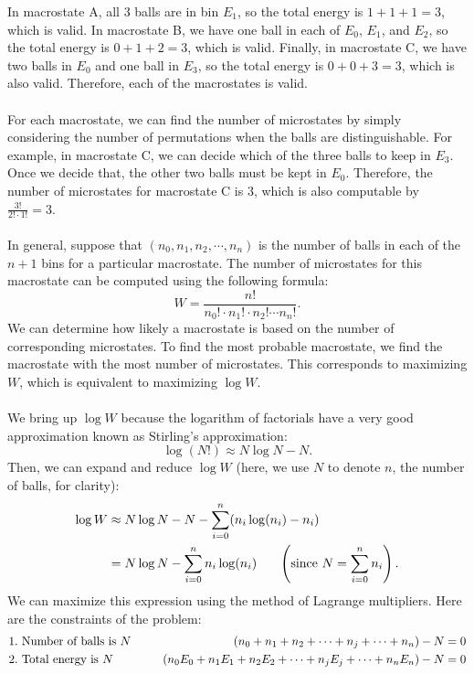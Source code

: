 \documentclass{article}
\begin{document}
\noindent 
In macrostate A, all 3 balls are in bin $E_1$, so the total energy is $1+1+1=3$, which is valid. In macrostate B, we have one ball in each of $E_0$, $E_1$, and $E_2$, so the total energy is $0+1+2=3$, which is valid. Finally, in macrostate C, we have two balls in $E_0$ and one ball in $E_3$, so the total energy is $0+0+3=3$, which is also valid. Therefore, each of the macrostates is valid. 
\\
\\
For each macrostate, we can find the number of microstates by simply considering the number of permutations when the balls are distinguishable. For example, in macrostate C, we can decide which of the three balls to keep in $E_3$. Once we decide that, the other two balls must be kept in $E_0$. Therefore, the number of microstates for macrostate C is 3, which is also computable by $\frac{3!}{2!\cdot 1!}=3$. 
\\
\\
In general, suppose that $(n_0, n_1, n_2, \cdots , n_n)$ is the number of balls in each of the $n+1$ bins for a particular macrostate. The number of microstates for this macrostate can be computed using the following formula:
\[W=\frac{n!}{n_0!\cdot n_1!\cdot n_2!\cdots n_n!}.\]
We can determine how likely a macrostate is based on the number of corresponding microstates. To find the most probable macrostate, we find the macrostate with the most number of microstates. This corresponds to maximizing $W$, which is equivalent to maximizing $\log W$.
\\
\\
We bring up $\log W$ because the logarithm of factorials have a very good approximation known as Stirling's approximation:
\[\log (N!)\approx N\log N-N.\]
Then, we can expand and reduce $\log W$ (here, we use $N$ to denote $n$, the number of balls, for clarity):
\begin{align*}
    \log W &\approx N\log N-N - \sum_{i=0}^n (n_i \log(n_i) - n_i) \\
    &= N\log N - \sum_{i=0}^n n_i \log(n_i) \hspace{6mm} \left(\text{since }N=\sum_{i=0}^n n_i\right).
\end{align*}
We can maximize this expression using the method of Lagrange multipliers. Here are the constraints of the problem:
\begin{align*}
    1.&\text{ Number of balls is }N&\hspace{6mm}(n_0+n_1+n_2+\cdots+n_j+\cdots+n_n)-N&=0\\
    2.&\text{ Total energy is  }N&\hspace{6mm} (n_0E_0+n_1E_1+n_2E_2+\cdots+n_jE_j+\cdots+n_nE_n)-N&=0\\
\end{align*}
\end{document}
